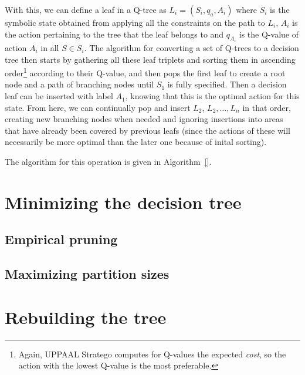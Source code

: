 \documentclass{article}
\begin{document}
With this, we can define a leaf in a Q-tree as $L_i = (S_i, q_a, A_i)$ where
$S_i$ is the symbolic state obtained from applying all the constraints on the
path to $L_i$, $A_i$ is the action pertaining to the tree that the leaf belongs
to and $q_{A_i}$ is the Q-value of action $A_i$ in all $S \in S_i$. The
algorithm for converting a set of Q-trees to a decision tree then starts by
gathering all these leaf triplets and sorting them in ascending order\footnote{%
    Again, UPPAAL Stratego computes for Q-values the expected \textit{cost}, so
the action with the lowest Q-value is the most preferable.} according to their
Q-value, and then pops the first leaf to create a root node and a path of
branching nodes until $S_1$ is fully specified. Then a decision leaf can be
inserted with label $A_1$, knowing that this is the optimal action for this
state. From here, we can continually pop and insert $L_2$, $L_2, \ldots, L_n$ in
that order, creating new branching nodes when needed and ignoring insertions
into areas that have already been covered by previous leafs (since the actions
of these will necessarily be more optimal than the later one because of inital
sorting).

The algorithm for this operation is given in Algorithm~\ref{}.


\section{Minimizing the decision tree}%
\label{sec:minimizingDT}

\lipsum[1]

\subsection{Empirical pruning}%
\label{subsec:empPruning}

\lipsum[2]

\subsection{Maximizing partition sizes}%
\label{subsec:findBoxes}

\lipsum[3]


\section{Rebuilding the tree}%
\label{sec:rebuildTree}

\lipsum[5]
\end{document}
